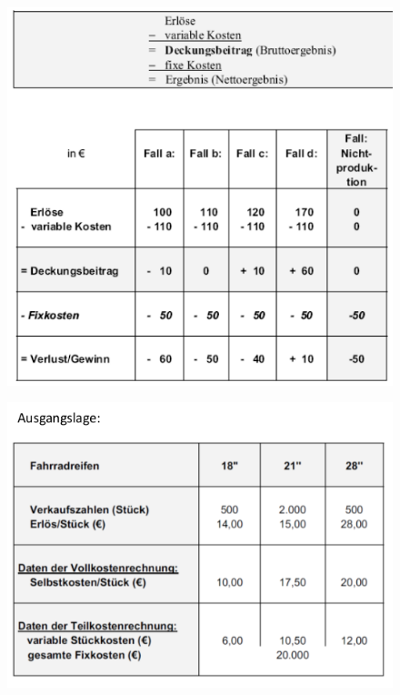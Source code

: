 \documentclass[a4paper,11pt, twoside]{article}
\begin{document}
\begin{figure}[h]
 \begin{center}
   \includegraphics[scale=0.5]{bilder/deckungsbeitragsrechnung.png}
 \end{center}
\end{figure}

\begin{figure}[h]
 \begin{center}
   \includegraphics[scale=0.5]{bilder/beispiel_vollteilkostenrechnung1.png}
 \end{center}
\end{figure}
\end{document}
